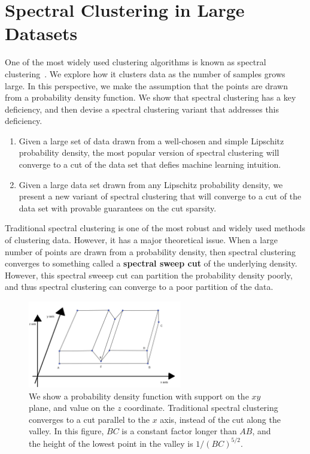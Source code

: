   \section{Spectral Clustering in Large
    Datasets}\label{sec:spectral-limit}

  One of the most widely used clustering algorithms is known as
  spectral clustering~\cite{NgSpectral01}. We explore how it clusters data as the number of
  samples grows large. In this perspective, we make the assumption that
  the points are drawn from a probability density function. We show that
  spectral clustering has a key deficiency, and then devise a spectral
  clustering variant that addresses this deficiency. 

  \begin{enumerate}
  \item Given a large set of data drawn from a well-chosen and simple Lipschitz probability
  density, the most popular version of spectral clustering will converge to a cut of
  the data set that defies machine learning intuition.
  \item Given a large data set drawn from any Lipschitz probability
  density, we present a new variant of spectral clustering that will
  converge to a cut of the data set with provable guarantees on
  the cut sparsity.
  \end{enumerate}
  
Traditional spectral clustering is one of the most robust and widely
used methods of clustering data. However, it has a major theoretical
issue. When a large number of points are drawn from a probability
density, then spectral clustering converges to something called a
\textbf{spectral sweep cut} of the underlying density.  However, this
spectral sweeep cut can partition the probability density poorly, and
thus spectral clustering can converge to a poor partition of the data.

\begin{figure}[htbp]
\centering
\includegraphics[width=0.6\textwidth]{images/counterexample.png}
\caption{
  We show a probability density function with support on the $xy$ plane,
  and value on the $z$ coordinate.  Traditional spectral clustering converges to a cut
  parallel to the $x$ axis, instead of the cut along the valley.
    In this figure,
  $BC$ is a constant
  factor longer than $AB$, and the height of the lowest point in the
  valley is
  $1/(BC)^{5/2}$. 
 }
\label{fig:spec}
\end{figure}

